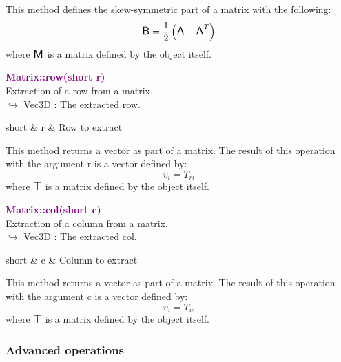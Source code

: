 This method defines the skew-symmetric part of a matrix with the following:
\begin{equation*}
\mbox{\large\ensuremath{\mathsf{B}}} = \frac{1}{2} \left( \mbox{\large\ensuremath{\mathsf{A}}} - \mbox{\large\ensuremath{\mathsf{A}}}^T \right)
\end{equation*}
where $\mbox{\large\ensuremath{\mathsf{M}}}$ is a matrix defined by the object itself.

\textcolor{purple}{\textbf{Matrix::row(short r)}}\label{Matrix::row(short r)}\\
Extraction of a row from a matrix.\\ \hspace*{10mm}$\hookrightarrow$ Vec3D : The extracted row.

\begin{tcolorbox}[width=\textwidth,myArgs,tabularx={ll|R}]
short & r & Row to extract
\end{tcolorbox}

This method returns a vector as part of a matrix.
The result of this operation with the argument r is a vector defined by:
\begin{equation*}
v_{i} = T_{ri}
\end{equation*}
where $\mbox{\large\ensuremath{\mathsf{T}}}$ is a matrix defined by the object itself.

\textcolor{purple}{\textbf{Matrix::col(short c)}}\label{Matrix::col(short c)}\\
Extraction of a column from a matrix.\\ \hspace*{10mm}$\hookrightarrow$ Vec3D : The extracted col.

\begin{tcolorbox}[width=\textwidth,myArgs,tabularx={ll|R}]
short & c & Column to extract
\end{tcolorbox}

This method returns a vector as part of a matrix.
The result of this operation with the argument c is a vector defined by:
\begin{equation*}
v_{i} = T_{ic}
\end{equation*}
where $\mbox{\large\ensuremath{\mathsf{T}}}$ is a matrix defined by the object itself.

\subsubsection{Advanced operations}

